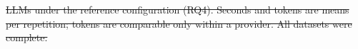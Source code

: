 \documentclass[conference]{IEEEtran}
\newcommand{\best}[1]{\textbf{\boldmath #1}} %
\providecommand{\DIFdeltex}[1]{{\protect\color{red}\sout{#1}}}                      %
\providecommand{\DIFdelbegin}{} %
\providecommand{\DIFdelFL}[1]{\DIFdel{#1}} %
\providecommand{\DIFdel}[1]{\texorpdfstring{\DIFdeltex{#1}}{}} %
\newcommand{\DIFscaledelfig}{0.5}
\newlength{\DIFdelgraphicswidth} %
\newlength{\DIFdelgraphicsheight} %
\newcommand{\DIFdelincludegraphics}[2][]{%
\sbox{\DIFdelgraphicsbox}{\DIFOincludegraphics[#1]{#2}}%
\settoboxwidth{\DIFdelgraphicswidth}{\DIFdelgraphicsbox} %
\settoboxtotalheight{\DIFdelgraphicsheight}{\DIFdelgraphicsbox} %
\scalebox{\DIFscaledelfig}{%
\parbox[b]{\DIFdelgraphicswidth}{\usebox{\DIFdelgraphicsbox}\\[-\baselineskip] \rule{\DIFdelgraphicswidth}{0em}}\llap{\resizebox{\DIFdelgraphicswidth}{\DIFdelgraphicsheight}{%
\setlength{\unitlength}{\DIFdelgraphicswidth}%
\begin{picture}(1,1)%
\thicklines\linethickness{2pt} %
{\color[rgb]{1,0,0}\put(0,0){\framebox(1,1){}}}%
{\color[rgb]{1,0,0}\put(0,0){\line( 1,1){1}}}%
{\color[rgb]{1,0,0}\put(0,1){\line(1,-1){1}}}%
\end{picture}%
}\hspace*{3pt}}} %
} %
\DeclareRobustCommand{\DIFdelbegin}{\DIFOdelbegin \let\includegraphics\DIFdelincludegraphics} %
\begin{document}
\DIFdelbegin %
{%
\DIFdelFL{LLMs under the reference configuration (RQ4). Seconds and tokens are means per repetition; tokens are comparable only within a provider. All datasets were complete.}}
\end{document}

